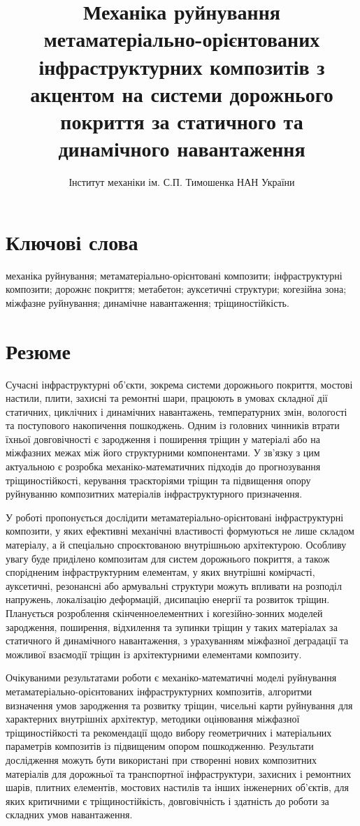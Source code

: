 \documentclass[12pt,a4paper]{article}
\title{Механіка руйнування метаматеріально-орієнтованих інфраструктурних композитів з акцентом на системи дорожнього покриття за статичного та динамічного навантаження}
\author{Інститут механіки ім. С.П. Тимошенка НАН України}
\date{}
\begin{document}
\maketitle

\section*{Ключові слова}
механіка руйнування; метаматеріально-орієнтовані композити; інфраструктурні композити; дорожнє покриття; метабетон; ауксетичні структури; когезійна зона; міжфазне руйнування; динамічне навантаження; тріщиностійкість.

\section{Резюме}
Сучасні інфраструктурні об'єкти, зокрема системи дорожнього покриття, мостові настили, плити, захисні та ремонтні шари, працюють в умовах складної дії статичних, циклічних і динамічних навантажень, температурних змін, вологості та поступового накопичення пошкоджень. Одним із головних чинників втрати їхньої довговічності є зародження і поширення тріщин у матеріалі або на міжфазних межах між його структурними компонентами. У зв'язку з цим актуальною є розробка механіко-математичних підходів до прогнозування тріщиностійкості, керування траєкторіями тріщин та підвищення опору руйнуванню композитних матеріалів інфраструктурного призначення.

У роботі пропонується дослідити метаматеріально-орієнтовані інфраструктурні композити, у яких ефективні механічні властивості формуються не лише складом матеріалу, а й спеціально спроєктованою внутрішньою архітектурою. Особливу увагу буде приділено композитам для систем дорожнього покриття, а також спорідненим інфраструктурним елементам, у яких внутрішні комірчасті, ауксетичні, резонансні або армувальні структури можуть впливати на розподіл напружень, локалізацію деформацій, дисипацію енергії та розвиток тріщин. Планується розроблення скінченноелементних і когезійно-зонних моделей зародження, поширення, відхилення та зупинки тріщин у таких матеріалах за статичного й динамічного навантаження, з урахуванням міжфазної деградації та можливої взаємодії тріщин із архітектурними елементами композиту.

Очікуваними результатами роботи є механіко-математичні моделі руйнування метаматеріально-орієнтованих інфраструктурних композитів, алгоритми визначення умов зародження та розвитку тріщин, чисельні карти руйнування для характерних внутрішніх архітектур, методики оцінювання міжфазної тріщиностійкості та рекомендації щодо вибору геометричних і матеріальних параметрів композитів із підвищеним опором пошкодженню. Результати дослідження можуть бути використані при створенні нових композитних матеріалів для дорожньої та транспортної інфраструктури, захисних і ремонтних шарів, плитних елементів, мостових настилів та інших інженерних об'єктів, для яких критичними є тріщиностійкість, довговічність і здатність до роботи за складних умов навантаження.
\end{document}
